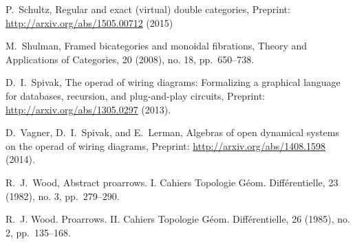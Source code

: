 \documentclass[11pt,oneside,article]{memoir}
\begin{document}
\begin{thebibliography}{XXX}
 P.~Schultz, Regular and exact (virtual) double categories, Preprint: \url{http://arxiv.org/abs/1505.00712} (2015)

 M.~Shulman, Framed bicategories and monoidal fibrations, Theory and Applications of Categories, 20 (2008), no. 18, pp.~650--738.

 D.~I.~Spivak, The operad of wiring diagrams: Formalizing a graphical language for databases, recursion, and plug-and-play circuits, Preprint: \url{http://arxiv.org/abs/1305.0297} (2013).

 D.~Vagner, D.~I.~Spivak, and E.~Lerman, Algebras of open dynamical systems on the operad of wiring diagrams, Preprint: \url{http://arxiv.org/abs/1408.1598} (2014).

 R.~J.~Wood, Abstract proarrows. I. Cahiers Topologie G\'{e}om. Diff\'{e}rentielle, 23 (1982), no. 3, pp.~279--290.

 R.~J. Wood. Proarrows. II. Cahiers Topologie G\'{e}om. Diff\'{e}rentielle, 26 (1985), no. 2, pp.~135--168.

\end{thebibliography}
\end{document}
